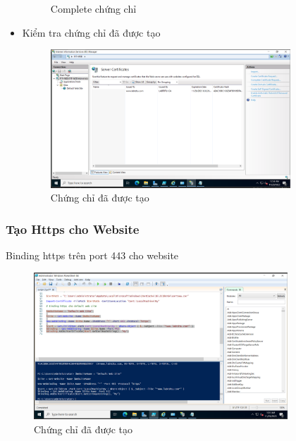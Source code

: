 \documentclass[13pt]{report}
\begin{document}
\begin{itemize}
\begin{figure}[htp]
			\caption{Complete chứng chỉ}
		\end{figure}
		\item Kiểm tra chứng chỉ đã được tạo
		\begin{figure}[htp]
			\centering
			\includegraphics[width=0.85\textwidth]{image/PowerShell/ADCS/13.png}
			\caption{Chứng chỉ đã được tạo}
		\end{figure}
	\end{itemize}
	\newpage
	\subsubsection{Tạo Https cho Website}
	Binding https trên port 443 cho website
	\begin{figure}[htp]
		\centering
		\includegraphics[width=0.85\textwidth]{image/PowerShell/Https.png}
		\caption{Chứng chỉ đã được tạo}
	\end{figure}
\end{document}
